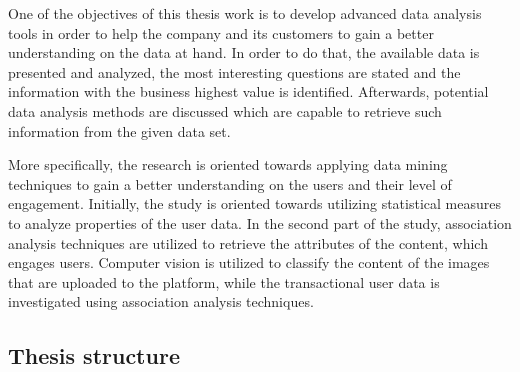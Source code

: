     One of the objectives of this thesis work is to develop advanced data analysis tools in order to help the company and its customers to gain a better understanding on the data at hand. In order to do that, the available data is presented and analyzed, the most interesting questions are stated and the information with the business highest value is identified. Afterwards, potential data analysis methods are discussed which are capable to retrieve such information from the given data set.  

    More specifically, the research is oriented towards applying data mining techniques to gain a better understanding on the users and their level of engagement. Initially, the study is oriented towards utilizing statistical measures to analyze properties of the user data. In the second part of the study, association analysis techniques are utilized to retrieve the attributes of the content, which engages users. Computer vision is utilized to classify the content of the images that are uploaded to the platform, while the transactional user data is investigated using association analysis techniques. %

\subsection{Thesis structure}

